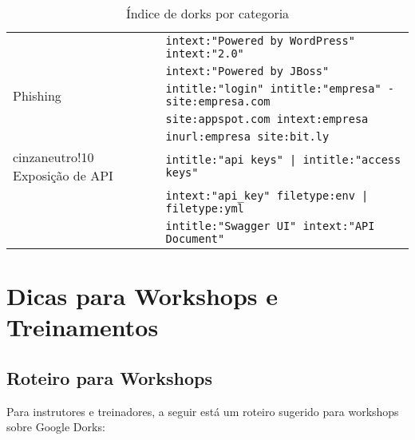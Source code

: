 \documentclass[12pt,a4paper]{book}
\begin{document}
\begin{table}[h]
\begin{tabular}{|p{5cm}|p{10cm}|}
& \texttt{intext:"Powered by WordPress" intext:"2.0"} \\
& \texttt{intext:"Powered by JBoss"} \\
\hline
Phishing & \texttt{intitle:"login" intitle:"empresa" -site:empresa.com} \\
& \texttt{site:appspot.com intext:empresa} \\
& \texttt{inurl:empresa site:bit.ly} \\
\hline
{cinzaneutro!10} Exposição de API & \texttt{intitle:"api keys" | intitle:"access keys"} \\
& \texttt{intext:"api\_key" filetype:env | filetype:yml} \\
& \texttt{intitle:"Swagger UI" intext:"API Document"} \\
\hline
\end{tabular}
\caption{Índice de dorks por categoria}
\end{table}

\chapter{Dicas para Workshops e Treinamentos}

\section{Roteiro para Workshops}

Para instrutores e treinadores, a seguir está um roteiro sugerido para workshops sobre Google Dorks:
\end{document}

